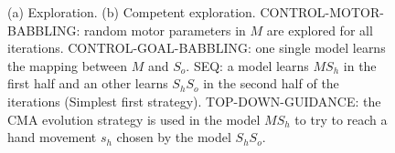 \documentclass[12pt]{article}
\begin{document}
	
		\begin{figure}[H]
			\centering
			\caption{(a) Exploration. (b) Competent exploration. CONTROL-MOTOR-BABBLING: random motor parameters in $M$ are explored for all iterations. CONTROL-GOAL-BABBLING: one single model learns the mapping between $M$ and $S_o$. SEQ: a model learns $MS_h$ in the first half and an other learns $S_hS_o$ 
					 in the second half of the iterations (Simplest first strategy). TOP-DOWN-GUIDANCE: the CMA evolution strategy is used in the model $MS_h$ to try to reach a hand movement 
					 $s_h$ chosen by the model $S_hS_o$.}
			\label{explo_comp}
		\end{figure}

		
\end{document}

